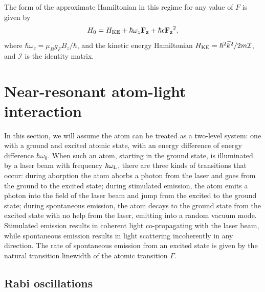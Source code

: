 The form of the approximate Hamiltonian in this regime for any value of $F$ is given by
\begin{equation}
H_0 = H_{\rm KE} + \hbar \omega_z \mathbf{F_z} + \hbar\epsilon \mathbf{F_z}^2,
\end{equation}
where $\hbar \omega_z = \mu_B g_F B_z/\hbar$, and the kinetic energy Hamiltonian $H_{\rm KE} = \hbar^2 \vec{k}^2/2m \mathcal{I}$, and $\mathcal{I}$ is the identity matrix.

\section{Near-resonant atom-light interaction}\label{sec:NRatomLight}

In this section, we will assume the atom can be treated as a two-level system: one with a ground and excited atomic state, with an energy difference of energy difference $\hbar\omega_0$. When such an atom, starting in the ground state, is illuminated by a laser beam with frequency $\hbar\omega_{\rm{L}}$, there are three kinds of transitions that occur: during aborption the atom aborbs a photon from the laser and goes from the ground to the excited state; during stimulated emission, the atom emits a photon into the field of the laser beam and jump from the excited to the ground state; during spontaneous emission, the atom decays to the ground state from the excited state with no help from the laser, emitting into a random vacuum mode. Stimulated emission results in coherent light co-propagating with the laser beam, while spontaneous emission results in light scattering incoherently in any direction. The rate of spontaneous emission from an excited state is given by the natural transition linewidth of the atomic transition $\Gamma$. 

\subsection{Rabi oscillations}\label{sec:Rabi}

